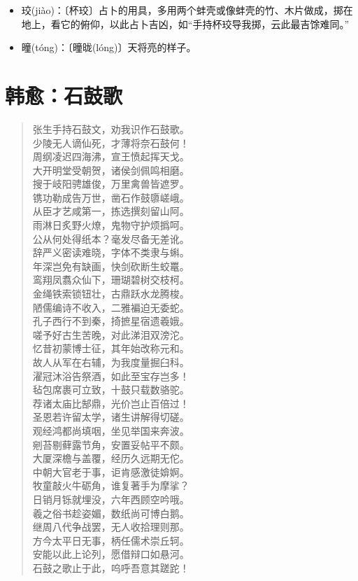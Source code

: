 \documentclass[12pt,oneside]{book}
\newenvironment{shici}{
\begin{verse}
\centering\large\hspace{12pt}}
{\end{verse}}
\begin{document}
\begin{itemize}
\item 珓(jiào)：〔杯珓〕占卜的用具，多用两个蚌壳或像蚌壳的竹、木片做成，掷在地上，看它的俯仰，以此占卜吉凶，如“手持杯珓导我掷，云此最吉馀难同。”
\item 曈(tóng)：〔曈昽(lóng)〕天将亮的样子。
\end{itemize}


\chapter{韩愈：石鼓歌}
\begin{shici}
张生手持石鼓文，劝我识作石鼓歌。\\
少陵无人谪仙死，才薄将奈石鼓何！\\
周纲凌迟四海沸，宣王愤起挥天戈。\\
大开明堂受朝贺，诸侯剑佩鸣相磨。\\
搜于岐阳骋雄俊，万里禽兽皆遮罗。\\
镌功勒成告万世，凿石作鼓隳嵯峨。\\
从臣才艺咸第一，拣选撰刻留山阿。\\
雨淋日炙野火燎，鬼物守护烦撝呵。\\
公从何处得纸本？毫发尽备无差讹。\\
辞严义密读难晓，字体不类隶与蝌。\\
年深岂免有缺画，快剑砍断生蛟鼍。\\
鸾翔凤翥众仙下，珊瑚碧树交枝柯。\\
金绳铁索锁钮壮，古鼎跃水龙腾梭。\\
陋儒编诗不收入，二雅褊迫无委蛇。\\
孔子西行不到秦，掎摭星宿遗羲娥。\\
嗟予好古生苦晚，对此涕泪双滂沱。\\
忆昔初蒙博士征，其年始改称元和。\\
故人从军在右辅，为我度量掘臼科。\\
濯冠沐浴告祭酒，如此至宝存岂多！\\
毡包席裹可立致，十鼓只载数骆驼。\\
荐诸太庙比郜鼎，光价岂止百倍过！\\
圣恩若许留太学，诸生讲解得切磋。\\
观经鸿都尚填咽，坐见举国来奔波。\\
剜苔剔藓露节角，安置妥帖平不颇。\\
大厦深檐与盖覆，经历久远期无佗。\\
中朝大官老于事，讵肯感激徒媕婀。\\
牧童敲火牛砺角，谁复著手为摩挲？\\
日销月铄就埋没，六年西顾空吟哦。\\
羲之俗书趁姿媚，数纸尚可博白鹅。\\
继周八代争战罢，无人收拾理则那。\\
方今太平日无事，柄任儒术崇丘轲。\\
安能以此上论列，愿借辩口如悬河。\\
石鼓之歌止于此，呜呼吾意其蹉跎！
\end{shici}
\end{document}
